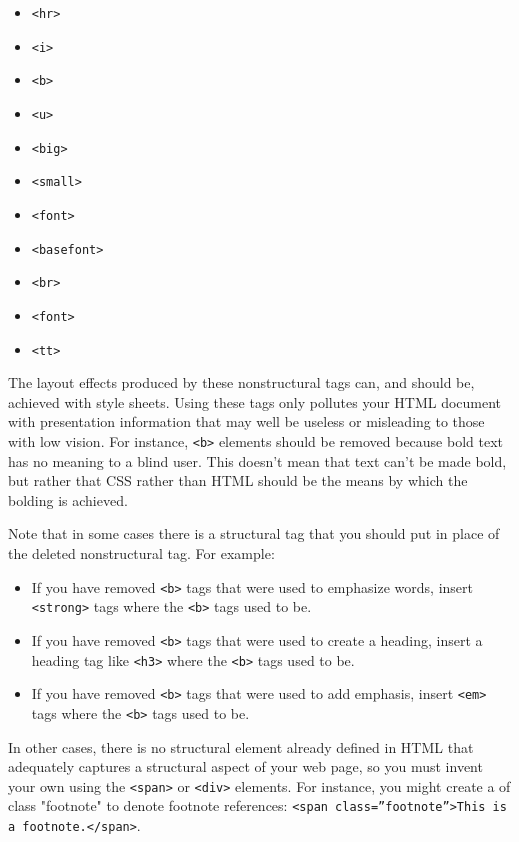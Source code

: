 \documentclass{article}
\begin{document}
\begin{enumerate}
\begin{itemize}
\item \texttt{<hr>}
\item \texttt{<i>}
\item \texttt{<b>}
\item \texttt{<u>}
\item \texttt{<big>}
\item \texttt{<small>}
\item \texttt{<font>}
\item \texttt{<basefont>}
\item \texttt{<br>}
\item \texttt{<font>}
\item \texttt{<tt>}
\end{itemize}

The layout effects produced by these nonstructural tags can, and should
be, achieved with style sheets. Using these tags only pollutes your HTML
document with presentation information that may well be useless or
misleading to those with low vision. For instance, \texttt{<b>} elements should
be removed because bold text has no meaning to a blind user. This
doesn't mean that text can't be made bold, but rather that CSS rather
than HTML should be the means by which the bolding is achieved.

Note that in some cases there is a structural tag that you should put in
place of the deleted nonstructural tag. For example:

\begin{itemize}
\item If you have removed \texttt{<b>} tags that were used to emphasize words,
insert \texttt{<strong>} tags where the \texttt{<b>} tags used to be.
\item If you have removed \texttt{<b>} tags that were used to create a heading,
insert a heading tag like \texttt{<h3>} where the \texttt{<b>} tags used to be.
\item If you have removed \texttt{<b>} tags that were used to add emphasis, insert
\texttt{<em>} tags where the \texttt{<b>} tags used to be.
\end{itemize}

In other cases, there is no structural element already defined in HTML
that adequately captures a structural aspect of your web page, so you
must invent your own using the \texttt{<span>} or \texttt{<div>} elements. For
instance, you might create a of class "footnote" to denote footnote
references: \texttt{<span class=”footnote”>This is a footnote.</span>}.


\end{enumerate}
\end{document}
